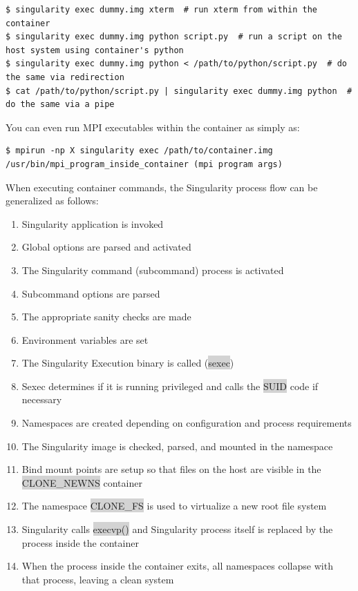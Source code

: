 \documentclass[a4paper]{article}
\newcounter{subsubsubsection}[subsubsection]
\begin{document}
\begin{lstlisting}[frame=single]
$ singularity exec dummy.img xterm  # run xterm from within the container
$ singularity exec dummy.img python script.py  # run a script on the host system using container's python
$ singularity exec dummy.img python < /path/to/python/script.py  # do the same via redirection
$ cat /path/to/python/script.py | singularity exec dummy.img python  # do the same via a pipe
\end{lstlisting}

You can even run MPI executables within the container as simply as:
\begin{lstlisting}[frame=single]
$ mpirun -np X singularity exec /path/to/container.img /usr/bin/mpi_program_inside_container (mpi program args)
\end{lstlisting}



When executing container commands, the Singularity process flow can be generalized as follows:
\begin{enumerate}
\item Singularity application is invoked
\item Global options are parsed and activated
\item The Singularity command (subcommand) process is activated
\item Subcommand options are parsed
\item The appropriate sanity checks are made
\item Environment variables are set
\item The Singularity Execution binary is called (\colorbox{lightgray}{sexec})
\item Sexec determines if it is running privileged and calls the \colorbox{lightgray}{SUID} code if necessary
\item Namespaces are created depending on configuration and process requirements
\item The Singularity image is checked, parsed, and mounted in the  namespace
\item Bind mount points are setup so that files on the host are visible in the \colorbox{lightgray}{CLONE\_NEWNS} container
\item The namespace \colorbox{lightgray}{CLONE\_FS} is used to virtualize a new root file system
\item Singularity calls \colorbox{lightgray}{execvp()} and Singularity process itself is replaced by the process inside the container
\item When the process inside the container exits, all namespaces collapse with that process, leaving a clean system
\end{enumerate}
\end{document}
